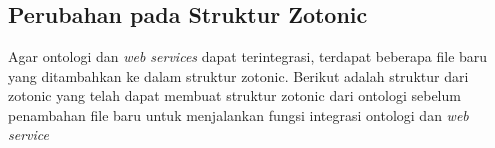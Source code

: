 \chapter{\babLima}

\section{Perubahan pada Struktur Zotonic}

Agar ontologi dan \textit{web services} dapat terintegrasi, terdapat beberapa file baru yang ditambahkan ke dalam struktur zotonic. Berikut adalah struktur dari zotonic yang telah dapat membuat struktur zotonic dari ontologi sebelum penambahan file baru untuk menjalankan fungsi integrasi ontologi dan \textit{web service}\\
